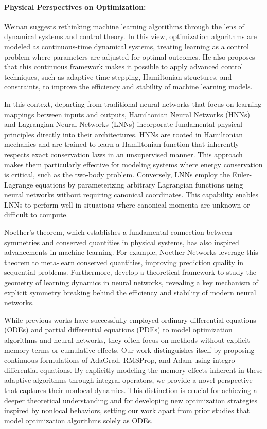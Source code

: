 \documentclass{article} %
\begin{document}
\paragraph{Physical Perspectives on Optimization:}
Weinan \cite{weinan2017proposal} suggests rethinking machine learning algorithms through the lens of dynamical systems and control theory. In this view, optimization algorithms are modeled as continuous-time dynamical systems, treating learning as a control problem where parameters are adjusted for optimal outcomes. He also proposes that this continuous framework makes it possible to apply advanced control techniques, such as adaptive time-stepping, Hamiltonian structures, and constraints, to improve the efficiency and stability of machine learning models.

In this context, departing from traditional neural networks that focus on learning mappings between inputs and outputs, Hamiltonian Neural Networks (HNNs) \cite{greydanus2019hamiltonian} and Lagrangian Neural Networks (LNNs) \cite{cranmer2020lagrangian} incorporate fundamental physical principles directly into their architectures. HNNs are rooted in Hamiltonian mechanics and are trained to learn a Hamiltonian function that inherently respects exact conservation laws in an unsupervised manner. This approach makes them particularly effective for modeling systems where energy conservation is critical, such as the two-body problem. Conversely, LNNs employ the Euler-Lagrange equations by parameterizing arbitrary Lagrangian functions using neural networks without requiring canonical coordinates. This capability enables LNNs to perform well in situations where canonical momenta are unknown or difficult to compute. 

Noether's theorem, which establishes a fundamental connection between symmetries and conserved quantities in physical systems, has also inspired advancements in machine learning. For example, Noether Networks \cite{alet2021noether} leverage this theorem to meta-learn conserved quantities, improving prediction quality in sequential problems. Furthermore, \cite{tanaka2021noether} develop a theoretical framework to study the geometry of learning dynamics in neural networks, revealing a key mechanism of explicit symmetry breaking behind the efficiency and stability of modern neural networks.

\vspace{0.4cm}

While previous works have successfully employed ordinary differential equations (ODEs) and partial differential equations (PDEs) to model optimization algorithms and neural networks, they often focus on methods without explicit memory terms or cumulative effects. Our work distinguishes itself by proposing continuous formulations of AdaGrad, RMSProp, and Adam using integro-differential equations. By explicitly modeling the memory effects inherent in these adaptive algorithms through integral operators, we provide a novel perspective that captures their nonlocal dynamics. This distinction is crucial for achieving a deeper theoretical understanding and for developing new optimization strategies inspired by nonlocal behaviors, setting our work apart from prior studies that model optimization algorithms solely as ODEs.
\end{document}
